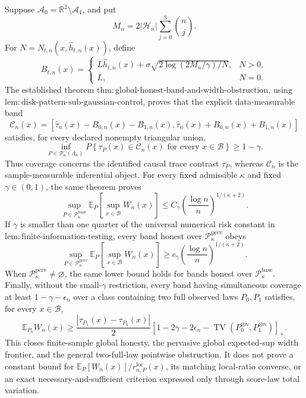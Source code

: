 Suppose \(\mathcal A_0=\mathbb R^2\setminus\mathcal A_1\), and put
\[
 M_n=2|\mathcal H_n|\sum_{j=0}^3\binom nj.
\]
For \(N=N_{t,n}(x,\widehat h_{t,n}(x))\), define
\[
 B_{t,n}(x)=
 \begin{cases}
 L\widehat h_{t,n}(x)+\sigma\sqrt{2\log(2M_n/\gamma)/N},&N>0,\\
 L,&N=0.
 \end{cases}
\]
The established theorem \(\mathrm{thm:global\text{-}honest\text{-}band\text{-}and\text{-}width\text{-}obstruction}\), using \(\mathrm{lem:disk\text{-}pattern\text{-}sub\text{-}gaussian\text{-}control}\), proves that the explicit data-measurable band
\[
 \mathcal C_n(x)=
 \left[
 \widehat\tau_n(x)-B_{0,n}(x)-B_{1,n}(x),
 \widehat\tau_n(x)+B_{0,n}(x)+B_{1,n}(x)
 \right]
\]
satisfies, for every declared nonempty triangular union,
\[
 \inf_{P\in\mathcal P_n(\Lambda_n)}
 P\!\left\{\tau_P(x)\in\mathcal C_n(x)
 \text{ for every }x\in\mathcal B\right\}\ge 1-\gamma.
\]
Thus coverage concerns the identified causal trace contrast \(\tau_P\), whereas \(\mathcal C_n\) is the sample-measurable inferential object.  For every fixed admissible \(\kappa\) and fixed \(\gamma\in(0,1)\), the same theorem proves
\[
 \sup_{P\in\mathcal P_{\kappa}^{\mathrm{base}}}
 \mathbb E_P\!\left[\sup_{x\in\mathcal B}W_n(x)\right]
 \le C_\gamma\left(\frac{\log n}{n}\right)^{1/(\kappa+2)}.
\]
If \(\gamma\) is smaller than one quarter of the universal numerical risk constant in \(\mathrm{lem:finite\text{-}information\text{-}testing}\), every band honest over \(\mathcal P_{\kappa}^{\mathrm{perv}}\) obeys
\[
 \sup_{P\in\mathcal P_{\kappa}^{\mathrm{perv}}}
 \mathbb E_P\!\left[\sup_{x\in\mathcal B}W_n(x)\right]
 \ge c_\gamma\left(\frac{\log n}{n}\right)^{1/(\kappa+2)}.
\]
When \(\mathcal P_{\kappa}^{\mathrm{perv}}\ne\varnothing\), the same lower bound holds for bands honest over \(\mathcal P_{\kappa}^{\mathrm{base}}\).  Finally, without the small-\(\gamma\) restriction, every band having simultaneous coverage at least \(1-\gamma-\epsilon_n\) over a class containing two full observed laws \(P_0,P_1\) satisfies, for every \(x\in\mathcal B\),
\[
 \mathbb E_{P_0}W_n(x)
 \ge
 \frac{|\tau_{P_1}(x)-\tau_{P_0}(x)|}{2}
 \left[
 1-2\gamma-2\epsilon_n-
 \operatorname{TV}(P_0^{\otimes n},P_1^{\otimes n})
 \right]_+.
\]
This closes finite-sample global honesty, the pervasive global expected-sup width frontier, and the general two-full-law pointwise obstruction.  It does not prove a constant bound for \(\mathbb E_P[W_n(x)]/r_{n,P}^{\mathrm{loc}}(x)\), its matching local-ratio converse, or an exact necessary-and-sufficient criterion expressed only through score-law total variation.